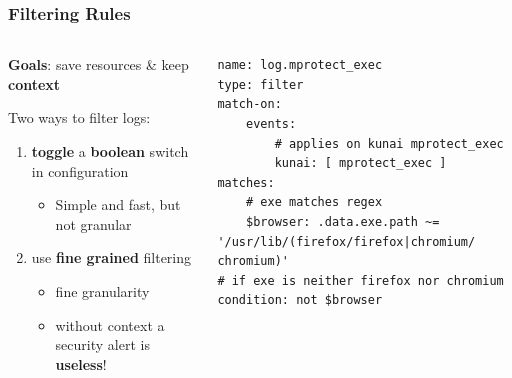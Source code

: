 \documentclass[10pt,aspectratio=169, colorlinks=true, linkcolor=circlBlue]{beamer}
\begin{document}
\begin{frame}[fragile]
	\frametitle{Filtering Rules}

	\begin{columns}
		\begin{column}{0.45\textwidth}
			\textbf{Goals}: save resources \& keep \textbf{context}

			Two ways to filter logs:
			\begin{enumerate}
				\item \textbf{toggle} a \textbf{boolean} switch in configuration
				      \begin{itemize}
					      \item[] Simple and fast, but not granular
				      \end{itemize}
				\item use \textbf{fine grained} filtering
				      \begin{itemize}
					      \item fine granularity
					      \item without context a security alert is \textbf{useless}!
				      \end{itemize}
			\end{enumerate}
		\end{column}

		\begin{column}{0.6\textwidth}
			\begin{verbatim}
name: log.mprotect_exec
type: filter
match-on:
    events:
        # applies on kunai mprotect_exec
        kunai: [ mprotect_exec ]
matches:
    # exe matches regex
    $browser: .data.exe.path ~= '/usr/lib/(firefox/firefox|chromium/
chromium)'
# if exe is neither firefox nor chromium
condition: not $browser
	\end{verbatim}
		\end{column}
	\end{columns}
\end{frame}
\end{document}
